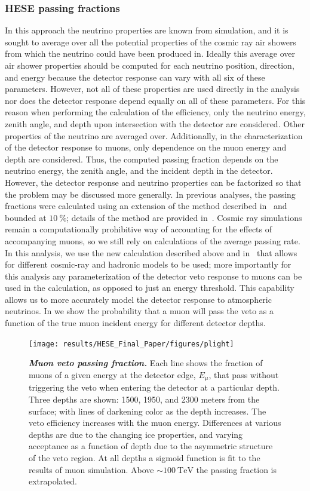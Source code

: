 \subsubsection{HESE passing fractions}
In this approach the neutrino properties are known from simulation, and it is sought to average over all the potential properties of the cosmic ray air showers from which the neutrino could have been produced in.
Ideally this average over air shower properties should be computed for each neutrino position, direction, and energy because the detector response can vary with all six of these parameters.
However, not all of these properties are used directly in the analysis nor does the detector response depend equally on all of these parameters.
For this reason when performing the calculation of the efficiency, only the neutrino energy, zenith angle, and depth upon intersection with the detector are considered.
Other properties of the neutrino are averaged over.
Additionally, in the characterization of the detector response to muons, only dependence on the muon energy and depth are considered.
Thus, the computed passing fraction depends on the neutrino energy, the zenith angle, and the incident depth in the detector.
However, the detector response and neutrino properties can be factorized so that the problem may be discussed more generally.
In previous analyses, the passing fractions were calculated using an extension of the method described in~\cite{Schonert:2008is} and bounded at $\SI{10}\percent$; details of the method are provided in~\cite{Aartsen:2013jdh}.
Cosmic ray simulations remain a computationally prohibitive way of accounting for the effects of accompanying muons, so we still rely on calculations of the average passing rate.
In this analysis, we use the new calculation described above and in~\cite{Arguelles:2018awr} that allows for different cosmic-ray and hadronic models to be used; more importantly for this analysis any parameterization of the detector veto response to muons can be used in the calculation, as opposed to just an energy threshold.
This capability allows us to more accurately model the detector response to atmospheric neutrinos.
In  we show the probability that a muon will pass the veto as a function of the true muon incident energy for different detector depths.

\begin{figure}
	\centering
	\texttt{[image: results/HESE\_Final\_Paper/figures/plight]}
	\internallinenumbers
	\caption{\textbf{\textit{Muon veto passing fraction.}} Each line shows the fraction of muons of a given energy at the detector edge, $E_\mu$, that pass without triggering the veto when entering the detector at a particular depth.
		Three depths are shown: 1500, 1950, and 2300 meters from the surface; with lines of darkening color as the depth increases.
		The veto efficiency increases with the muon energy.
		Differences at various depths are due to the changing ice properties, and varying acceptance as a function of depth due to the asymmetric structure of the veto region.
		At all depths a sigmoid function is fit to the results of muon simulation.
		Above $\sim\SI{100}\TeV$ the passing fraction is extrapolated.}\label{fig:P_light}
\end{figure}

